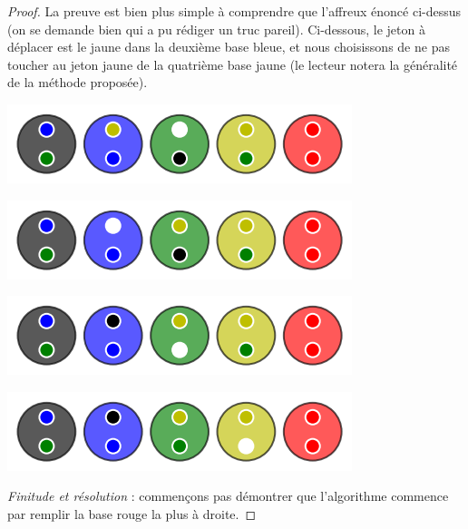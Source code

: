 \begin{proof}
	
	\medskip

	La preuve est bien plus simple à comprendre que l'affreux énoncé ci-dessus (on se demande bien qui a pu rédiger un truc pareil). Ci-dessous, le jeton à déplacer est le jaune dans la deuxième base bleue, et nous choisissons de ne pas toucher au jeton jaune de la quatrième base jaune (le lecteur notera la généralité de la méthode proposée).

	\vspace{-0.4em}
	\begin{center}   %
		\includegraphics[scale= 0.45]{content/algo_selection/fact_2/000.png}

		\includegraphics[scale= 0.45]{content/algo_selection/fact_2/001.png}

		\includegraphics[scale= 0.45]{content/algo_selection/fact_2/002.png}

		\includegraphics[scale= 0.45]{content/algo_selection/fact_2/003.png}

	\end{center}

	\vspace{-0.8em}


	\medskip

	\textit{Finitude et résolution} : commençons pas démontrer que l'algorithme commence par remplir la base rouge la plus à droite.


	\medskip


\end{proof}
